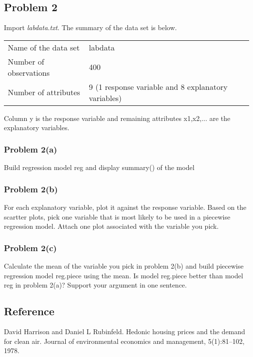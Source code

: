 \documentclass{article}
\begin{document}
\vspace{1cm}

\subsection*{Problem 2}
Import \textit{labdata.txt}. The summary of the data set is below.
\vspace{0.3cm}

\begin{tabular}{lll}
Name of the data set & labdata\\
Number of observations & 400  \\
Number of attributes & 9 (1 response variable and 8 explanatory variables)\\ 
\end{tabular}
\vspace{0.3cm}

\noindent Column \textsf{y} is the response variable and remaining attributes \textsf{x1,x2,...} are the explanatory variables.


\subsubsection*{Problem 2(a)}
Build regression model \textsf{reg} and display \textsf{summary()} of the model



\subsubsection*{Problem 2(b)}
For each explanatory variable, plot it against the response variable. Based on the scartter plots, pick one variable that is most likely to be used in a piecewise regression model. Attach one plot associated with the variable you pick.


\subsubsection*{Problem 2(c)}
Calculate the mean of the variable you pick in problem 2(b) and build piecewise regression model \textsf{reg.piece} using the mean. Is model \textsf{reg.piece} better than model \textsf{reg} in problem 2(a)? Support your argument in one sentence.



\subsection*{Reference}
David Harrison and Daniel L Rubinfeld. Hedonic housing prices and the demand for clean air. Journal of environmental economics and management, 5(1):81–102, 1978.
\end{document}
